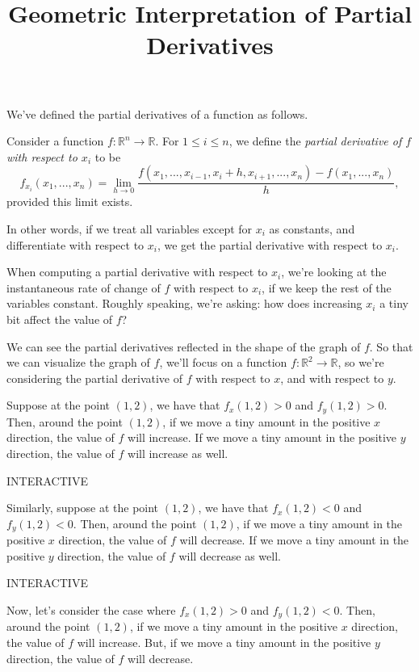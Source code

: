 \documentclass{ximera}
\title{Geometric Interpretation of Partial Derivatives}
\begin{document}
\begin{abstract}
\end{abstract}
\maketitle

We've defined the partial derivatives of a function as follows.

\begin{definition}
Consider a function $f:\mathbb{R}^n\rightarrow\mathbb{R}$. For $1\leq i\leq n$, we define the \emph{partial derivative of $f$ with respect to $x_i$} to be
\[
f_{x_i}(x_1,...,x_n) = \lim_{h\rightarrow 0}\frac{f(x_1,...,x_{i-1}, x_i+h, x_{i+1},...,x_n)-f(x_1,...,x_n)}{h},
\]
provided this limit exists.
\end{definition}

In other words, if we treat all variables except for $x_i$ as constants, and differentiate with respect to $x_i$, we get the partial derivative with respect to $x_i$. 

When computing a partial derivative with respect to $x_i$, we're looking at the instantaneous rate of change of $f$ with respect to $x_i$, if we keep the rest of the variables constant. Roughly speaking, we're asking: how does increasing $x_i$ a tiny bit affect the value of $f$?

We can see the partial derivatives reflected in the shape of the graph of $f$. So that we can visualize the graph of $f$, we'll focus on a function $f:\mathbb{R}^2\rightarrow\mathbb{R}$, so we're considering the partial derivative of $f$ with respect to $x$, and with respect to $y$.

Suppose at the point $(1,2)$, we have that $f_x(1,2)>0$ and $f_y(1,2)>0$. Then, around the point $(1,2)$, if we move a tiny amount in the positive $x$ direction, the value of $f$ will increase. If we move a tiny amount in the positive $y$ direction, the value of $f$ will increase as well.

INTERACTIVE

Similarly, suppose at the point $(1,2)$, we have that $f_x(1,2)<0$ and $f_y(1,2)<0$. Then, around the point $(1,2)$, if we move a tiny amount in the positive $x$ direction, the value of $f$ will decrease. If we move a tiny amount in the positive $y$ direction, the value of $f$ will decrease as well.

INTERACTIVE

Now, let's consider the case where $f_x(1,2)>0$ and $f_y(1,2)<0$. Then, around the point $(1,2)$, if we move a tiny amount in the positive $x$ direction, the value of $f$ will increase. But, if we move a tiny amount in the positive $y$ direction, the value of $f$ will decrease.
\end{document}

